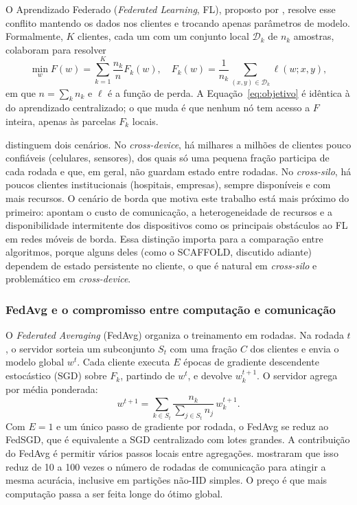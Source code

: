 O Aprendizado Federado (\textit{Federated Learning}, FL), proposto por \citet{mcmahan2017fedavg}, resolve esse conflito mantendo os dados nos clientes e trocando apenas parâmetros de modelo. Formalmente, $K$ clientes, cada um com um conjunto local $\mathcal{D}_k$ de $n_k$ amostras, colaboram para resolver
\begin{equation}
    \min_{w} F(w) = \sum_{k=1}^{K} \frac{n_k}{n} F_k(w), \quad F_k(w) = \frac{1}{n_k}\sum_{(x,y)\in\mathcal{D}_k} \ell(w; x, y),
    \label{eq:objetivo}
\end{equation}
em que $n=\sum_k n_k$ e $\ell$ é a função de perda. A Equação~\eqref{eq:objetivo} é idêntica à do aprendizado centralizado; o que muda é que nenhum nó tem acesso a $F$ inteira, apenas às parcelas $F_k$ locais.

\citet{kairouz2021advances} distinguem dois cenários. No \textit{cross-device}, há milhares a milhões de clientes pouco confiáveis (celulares, sensores), dos quais só uma pequena fração participa de cada rodada e que, em geral, não guardam estado entre rodadas. No \textit{cross-silo}, há poucos clientes institucionais (hospitais, empresas), sempre disponíveis e com mais recursos. O cenário de borda que motiva este trabalho está mais próximo do primeiro: \citet{lim2020mobileedge} apontam o custo de comunicação, a heterogeneidade de recursos e a disponibilidade intermitente dos dispositivos como os principais obstáculos ao FL em redes móveis de borda. Essa distinção importa para a comparação entre algoritmos, porque alguns deles (como o SCAFFOLD, discutido adiante) dependem de estado persistente no cliente, o que é natural em \textit{cross-silo} e problemático em \textit{cross-device}.

\subsubsection{FedAvg e o compromisso entre computação e comunicação}

O \textit{Federated Averaging} (FedAvg) \citep{mcmahan2017fedavg} organiza o treinamento em rodadas. Na rodada $t$, o servidor sorteia um subconjunto $S_t$ com uma fração $C$ dos clientes e envia o modelo global $w^t$. Cada cliente executa $E$ épocas de gradiente descendente estocástico (SGD) sobre $F_k$, partindo de $w^t$, e devolve $w_k^{t+1}$. O servidor agrega por média ponderada:
\begin{equation}
    w^{t+1} = \sum_{k \in S_t} \frac{n_k}{\sum_{j\in S_t} n_j}\, w_k^{t+1}.
    \label{eq:fedavg}
\end{equation}
Com $E=1$ e um único passo de gradiente por rodada, o FedAvg se reduz ao FedSGD, que é equivalente a SGD centralizado com lotes grandes. A contribuição do FedAvg é permitir vários passos locais entre agregações. \citet{mcmahan2017fedavg} mostraram que isso reduz de 10 a 100 vezes o número de rodadas de comunicação para atingir a mesma acurácia, inclusive em partições não-IID simples. O preço é que mais computação passa a ser feita longe do ótimo global.

